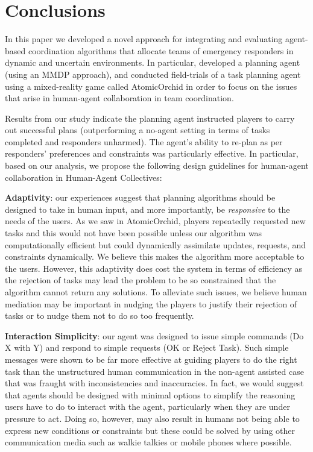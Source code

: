 \section{Conclusions}\label{sec:conclusions}
\noindent In this paper we developed a novel approach for integrating and evaluating agent-based coordination algorithms that allocate teams of emergency responders in dynamic and uncertain environments.  In particular, developed a planning agent (using an MMDP approach), and conducted field-trials of a task planning agent using a mixed-reality game  called AtomicOrchid in order to focus on the issues that arise in human-agent collaboration in team coordination.

Results from our study indicate  the planning agent instructed players to carry out successful plans (outperforming a no-agent setting in terms of tasks completed and responders unharmed). The agent's ability to re-plan  as per responders' preferences and constraints was particularly effective. In particular, based on our analysis, we propose the following design guidelines for human-agent collaboration in Human-Agent Collectives:

\noindent \textbf{Adaptivity}: our experiences suggest that planning algorithms should be designed to take in human input, and more importantly, be \emph{responsive} to the needs of the users. As we saw in AtomicOrchid, players repeatedly requested new tasks and this would not have been possible unless our algorithm  was computationally efficient but could dynamically assimilate updates, requests, and constraints dynamically. We believe this makes the algorithm more acceptable to the users. However, this adaptivity does cost the system in terms of efficiency as the rejection of tasks may lead the problem to be so constrained that the algorithm cannot return any solutions. To alleviate such issues, we believe human mediation may be important in nudging the players to justify their rejection of tasks or to nudge them not to do so too frequently. 

\noindent \textbf{Interaction Simplicity}: our agent was designed to issue simple commands (Do X with Y) and respond to simple requests (OK or Reject Task). Such simple messages were shown to be far more effective at guiding players to do the right task than the unstructured human communication in the non-agent assisted case that was fraught with inconsistencies and inaccuracies. In fact, we would suggest that agents should be designed with minimal options to simplify the reasoning users have to do to interact with the agent, particularly when they are under pressure to act.  Doing so, however, may also result in humans not being able to express new conditions or constraints but these could be solved by using other communication media such as walkie talkies or mobile phones where possible.

